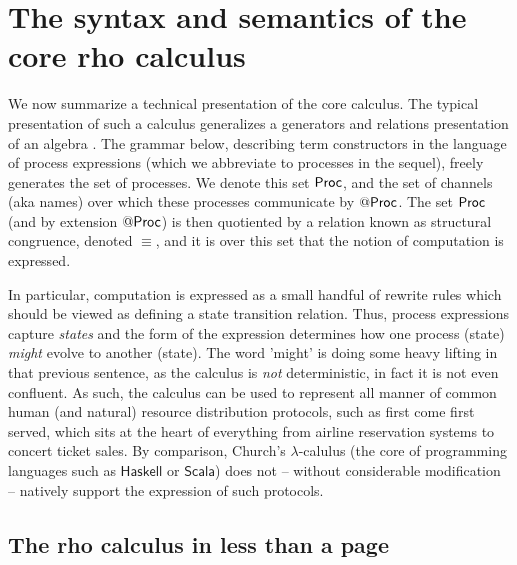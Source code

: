\section{The syntax and semantics of the core rho calculus}\label{sub:the_syntax_and_semantics_of_the_notation_system} %

We now summarize a technical presentation of the core calculus. The
typical presentation of such a calculus generalizes a generators and
relations presentation of an algebra
\cite{nlab:generators_and_relations}. The grammar below, describing
term constructors in the language of process expressions (which we
abbreviate to processes in the sequel), freely generates the set of
processes. We denote this set $\mathsf{Proc}$, and the set of channels (aka
names) over which these processes communicate by $\mathsf{@} \mathsf{Proc}$. The set
$\mathsf{Proc}$ (and by extension $\mathsf{@} \mathsf{Proc}$) is then quotiented by a relation
known as structural congruence, denoted $\equiv$, and it is over this
set that the notion of computation is expressed.

In particular, computation is expressed as a small handful of rewrite
rules which should be viewed as defining a state transition
relation. Thus, process expressions capture \emph{states} and the form
of the expression determines how one process (state) \emph{might}
evolve to another (state). The word 'might' is doing some heavy
lifting in that previous sentence, as the calculus is \emph{not}
deterministic, in fact it is not even confluent. As such, the calculus
can be used to represent all manner of common human (and natural)
resource distribution protocols, such as first come first served,
which sits at the heart of everything from airline reservation systems
to concert ticket sales. By comparison, Church's $\lambda$-calulus
(the core of programming languages such as $\mathsf{Haskell}$ or
$\mathsf{Scala}$) does not -- without considerable modification --
natively support the expression of such protocols.

\subsection{The rho calculus in less than a page}


